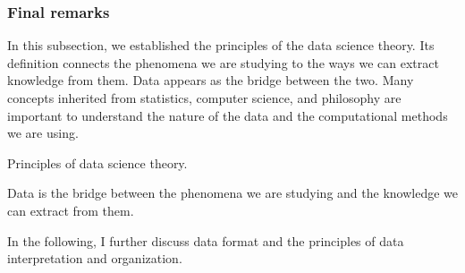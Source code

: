 \subsubsection{Final remarks}

In this subsection, we established the principles of the data science theory.  Its
definition connects the phenomena we are studying to the ways we can extract knowledge
from them.  Data appears as the bridge between the two.  Many concepts inherited
from statistics, computer science, and philosophy are important to understand the
nature of the data and the computational methods we are using.

\begin{figurebox}[label=fig:knowledge]{Principles of data science theory.}
  \centering
  \tcblower
  Data is the bridge between the phenomena we are studying and the knowledge we can
  extract from them.
\end{figurebox}

In the following, I further discuss data format and the principles of data interpretation
and organization.


